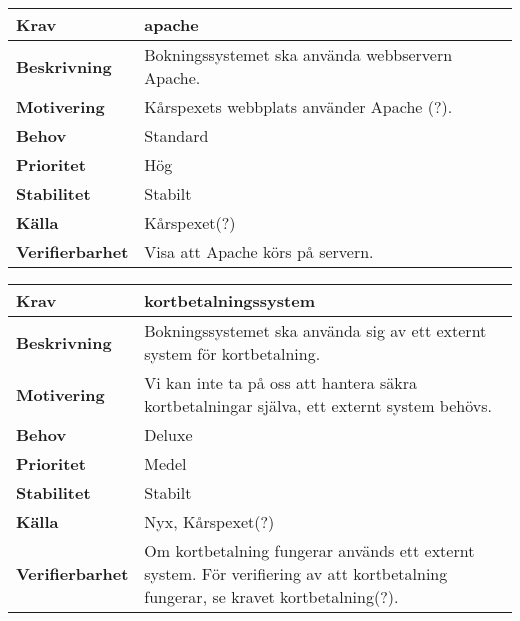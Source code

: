 \documentclass[a4paper, twoside, 11pt, titlepage]{article}
\begin{document}
		\begin{tabular} { | p{3cm} | p{12.2cm} | }
			\hline
			\textbf{Krav} & apache  \\
			\hline
			\textbf{Beskrivning} & Bokningssystemet ska använda webbservern Apache.  \\
			\hline
			\textbf{Motivering} & Kårspexets webbplats använder Apache (?).  \\
			\hline
			\textbf{Behov} & Standard  \\
			\hline
			\textbf{Prioritet} & Hög  \\
			\hline
			\textbf{Stabilitet} & Stabilt  \\
			\hline
			\textbf{Källa} & Kårspexet(?)  \\
			\hline
			\textbf{Verifierbarhet} & Visa att Apache körs på servern.  \\
			\hline
		\end{tabular}

		\begin{tabular} { | p{3cm} | p{12.2cm} | }
			\hline
			\textbf{Krav} & kortbetalningssystem  \\
			\hline
			\textbf{Beskrivning} & Bokningssystemet ska använda sig av ett externt system för kortbetalning.  \\
			\hline
			\textbf{Motivering} & Vi kan inte ta på oss att hantera säkra kortbetalningar själva, ett externt system behövs.  \\
			\hline
			\textbf{Behov} & Deluxe  \\
			\hline
			\textbf{Prioritet} & Medel  \\
			\hline
			\textbf{Stabilitet} & Stabilt  \\
			\hline
			\textbf{Källa} & Nyx, Kårspexet(?)  \\
			\hline
			\textbf{Verifierbarhet} & Om kortbetalning fungerar används ett externt system. För verifiering av att kortbetalning fungerar, se kravet kortbetalning(?).  \\
			\hline
		\end{tabular}
\end{document}
